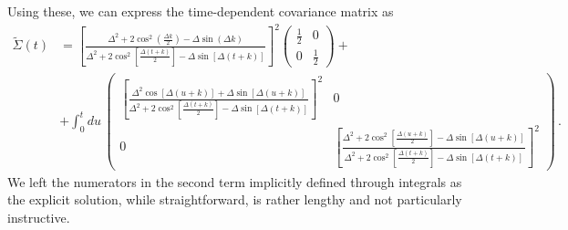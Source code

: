 \documentclass[prl,superscriptaddress,showpacs,longbibliography,reprint]{revtex4-2}
\begin{document}
Using these, we can express the time-dependent covariance matrix as
\begin{equation*}
\begin{split}
\tilde{\Sigma}(t)&=\left[\frac{\Delta^2 +2\cos^2\left(\frac{\Delta k}{2}\right)-\Delta \sin(\Delta k)}{\Delta^2 +2\cos^2\left[\frac{\Delta (t+k)}{2}\right]-\Delta \sin\left[\Delta (t+k)\right]}\right]^2 \begin{pmatrix}
\frac{1}{2}&0\\0&\frac{1}{2}
\end{pmatrix}+\\
&+\int_0^t du\, \begin{pmatrix}\left[\frac{\Delta^2\cos[\Delta(u+k)]+\Delta \sin[\Delta(u+k)]}{\Delta^2 +2\cos^2\left[\frac{\Delta (t+k)}{2}\right]-\Delta \sin\left[\Delta (t+k)\right]}\right]^2&0\\
0&\left[\frac{\Delta^2 +2\cos^2\left[\frac{\Delta (u+k)}{2}\right]-\Delta \sin\left[\Delta (u+k)\right]}{\Delta^2 +2\cos^2\left[\frac{\Delta (t+k)}{2}\right]-\Delta \sin\left[\Delta (t+k)\right]}\right]^2
\end{pmatrix}\, .
\end{split}
\end{equation*}
We left the numerators in the second term implicitly defined through integrals as the explicit solution, while straightforward, is rather lengthy and not particularly instructive. 
\end{document}
